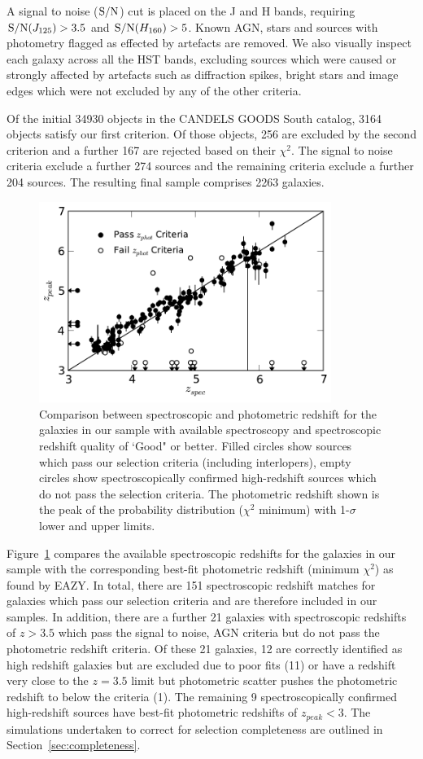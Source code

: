 A signal to noise ($\textup{S/N}$) cut is placed on the J and H bands, requiring $\textup{S/N}(J_{125}) > 3.5$ and $\textup{S/N}(H_{160}) > 5$. Known AGN, stars and sources with photometry flagged as effected by artefacts are removed. We also visually inspect each galaxy across all the HST bands, excluding sources which were caused or strongly affected by artefacts such as diffraction spikes, bright stars and image edges which were not excluded by any of the other criteria. 

Of the initial 34930 objects in the CANDELS GOODS South catalog, 3164 objects satisfy our first criterion. Of those objects, 256 are excluded by the second criterion and a further 167 are rejected based on their $\chi^{2}$. The signal to noise criteria exclude a further 274 sources and the remaining criteria exclude a further 204 sources. The resulting final sample comprises 2263 galaxies.

\begin{figure}
\centering
\includegraphics[width=95mm]{plots/fig1.pdf}
\caption[Short caption]{Comparison between spectroscopic and photometric redshift for the galaxies in our sample with available spectroscopy and spectroscopic redshift quality of `Good" or better. Filled circles show sources which pass our selection criteria (including interlopers), empty circles show spectroscopically confirmed high-redshift sources which do not pass the selection criteria. The photometric redshift shown is the peak of the probability distribution ($\chi^2$ minimum) with 1-$\sigma$ lower and upper limits.}
\label{fig:specz}
\end{figure}

Figure~\ref{fig:specz} compares the available spectroscopic redshifts for the galaxies in our sample with the corresponding best-fit photometric redshift (minimum $\chi^2$) as found by EAZY. In total, there are 151 spectroscopic redshift matches for galaxies which pass our selection criteria and are therefore included in our samples. In addition, there are a further 21 galaxies with spectroscopic redshifts of $z > 3.5$ which pass the signal to noise, AGN criteria but do not pass the photometric redshift criteria. Of these 21 galaxies, 12 are correctly identified as high redshift galaxies but are excluded due to poor fits (11) or have a redshift very close to the $z = 3.5$ limit but photometric scatter pushes the photometric redshift to below the criteria (1). The remaining 9 spectroscopically confirmed high-redshift sources have best-fit photometric redshifts of $z_{peak} < 3$. The simulations undertaken to correct for selection completeness are outlined in Section~\ref{sec:completeness}.

